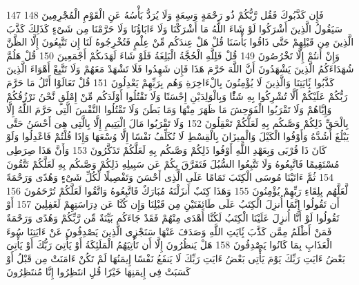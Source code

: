 \documentclass[20pt,a4paper]{article}
\begin{document}
{\tiny\colorbox{cl_aya}{147}} فَإِن كَذَّبُوكَ فَقُل رَّبُّكُمْ ذُو رَحْمَةٍ وَسِعَةٍ وَلَا يُرَدُّ بَأْسُهُ عَنِ الْقَوْمِ الْمُجْرِمِينَ
{\tiny\colorbox{cl_aya}{148}} سَيَقُولُ الَّذِينَ أَشْرَكُوا لَوْ شَاءَ اللَّهُ مَا أَشْرَكْنَا وَلَا ءَابَاؤُنَا وَلَا حَرَّمْنَا مِن شَىْءٍ كَذَلِكَ كَذَّبَ الَّذِينَ مِن قَبْلِهِمْ حَتَّى ذَاقُوا بَأْسَنَا قُلْ هَلْ عِندَكُم مِّنْ عِلْمٍ فَتُخْرِجُوهُ لَنَا إِن تَتَّبِعُونَ إِلَّا الظَّنَّ وَإِنْ أَنتُمْ إِلَّا تَخْرُصُونَ
{\tiny\colorbox{cl_aya}{149}} قُلْ فَلِلَّهِ الْحُجَّةُ الْبَلِغَةُ فَلَوْ شَاءَ لَهَدَىكُمْ أَجْمَعِينَ
{\tiny\colorbox{cl_aya}{150}} قُلْ هَلُمَّ شُهَدَاءَكُمُ الَّذِينَ يَشْهَدُونَ أَنَّ اللَّهَ حَرَّمَ هَذَا فَإِن شَهِدُوا فَلَا تَشْهَدْ مَعَهُمْ وَلَا تَتَّبِعْ أَهْوَاءَ الَّذِينَ كَذَّبُوا بَِٔايَتِنَا وَالَّذِينَ لَا يُؤْمِنُونَ بِالْءَاخِرَةِ وَهُم بِرَبِّهِمْ يَعْدِلُونَ
{\tiny\colorbox{cl_aya}{151}} قُلْ تَعَالَوْا أَتْلُ مَا حَرَّمَ رَبُّكُمْ عَلَيْكُمْ أَلَّا تُشْرِكُوا بِهِ شَئًْا وَبِالْوَلِدَيْنِ إِحْسَنًا وَلَا تَقْتُلُوا أَوْلَدَكُم مِّنْ إِمْلَقٍ نَّحْنُ نَرْزُقُكُمْ وَإِيَّاهُمْ وَلَا تَقْرَبُوا الْفَوَحِشَ مَا ظَهَرَ مِنْهَا وَمَا بَطَنَ وَلَا تَقْتُلُوا النَّفْسَ الَّتِى حَرَّمَ اللَّهُ إِلَّا بِالْحَقِّ ذَلِكُمْ وَصَّىكُم بِهِ لَعَلَّكُمْ تَعْقِلُونَ
{\tiny\colorbox{cl_aya}{152}} وَلَا تَقْرَبُوا مَالَ الْيَتِيمِ إِلَّا بِالَّتِى هِىَ أَحْسَنُ حَتَّى يَبْلُغَ أَشُدَّهُ وَأَوْفُوا الْكَيْلَ وَالْمِيزَانَ بِالْقِسْطِ لَا نُكَلِّفُ نَفْسًا إِلَّا وُسْعَهَا وَإِذَا قُلْتُمْ فَاعْدِلُوا وَلَوْ كَانَ ذَا قُرْبَى وَبِعَهْدِ اللَّهِ أَوْفُوا ذَلِكُمْ وَصَّىكُم بِهِ لَعَلَّكُمْ تَذَكَّرُونَ
{\tiny\colorbox{cl_aya}{153}} وَأَنَّ هَذَا صِرَطِى مُسْتَقِيمًا فَاتَّبِعُوهُ وَلَا تَتَّبِعُوا السُّبُلَ فَتَفَرَّقَ بِكُمْ عَن سَبِيلِهِ ذَلِكُمْ وَصَّىكُم بِهِ لَعَلَّكُمْ تَتَّقُونَ
{\tiny\colorbox{cl_aya}{154}} ثُمَّ ءَاتَيْنَا مُوسَى الْكِتَبَ تَمَامًا عَلَى الَّذِى أَحْسَنَ وَتَفْصِيلًا لِّكُلِّ شَىْءٍ وَهُدًى وَرَحْمَةً لَّعَلَّهُم بِلِقَاءِ رَبِّهِمْ يُؤْمِنُونَ
{\tiny\colorbox{cl_aya}{155}} وَهَذَا كِتَبٌ أَنزَلْنَهُ مُبَارَكٌ فَاتَّبِعُوهُ وَاتَّقُوا لَعَلَّكُمْ تُرْحَمُونَ
{\tiny\colorbox{cl_aya}{156}} أَن تَقُولُوا إِنَّمَا أُنزِلَ الْكِتَبُ عَلَى طَائِفَتَيْنِ مِن قَبْلِنَا وَإِن كُنَّا عَن دِرَاسَتِهِمْ لَغَفِلِينَ
{\tiny\colorbox{cl_aya}{157}} أَوْ تَقُولُوا لَوْ أَنَّا أُنزِلَ عَلَيْنَا الْكِتَبُ لَكُنَّا أَهْدَى مِنْهُمْ فَقَدْ جَاءَكُم بَيِّنَةٌ مِّن رَّبِّكُمْ وَهُدًى وَرَحْمَةٌ فَمَنْ أَظْلَمُ مِمَّن كَذَّبَ بَِٔايَتِ اللَّهِ وَصَدَفَ عَنْهَا سَنَجْزِى الَّذِينَ يَصْدِفُونَ عَنْ ءَايَتِنَا سُوءَ الْعَذَابِ بِمَا كَانُوا يَصْدِفُونَ
{\tiny\colorbox{cl_aya}{158}} هَلْ يَنظُرُونَ إِلَّا أَن تَأْتِيَهُمُ الْمَلَئِكَةُ أَوْ يَأْتِىَ رَبُّكَ أَوْ يَأْتِىَ بَعْضُ ءَايَتِ رَبِّكَ يَوْمَ يَأْتِى بَعْضُ ءَايَتِ رَبِّكَ لَا يَنفَعُ نَفْسًا إِيمَنُهَا لَمْ تَكُنْ ءَامَنَتْ مِن قَبْلُ أَوْ كَسَبَتْ فِى إِيمَنِهَا خَيْرًا قُلِ انتَظِرُوا إِنَّا مُنتَظِرُونَ
\end{document}
